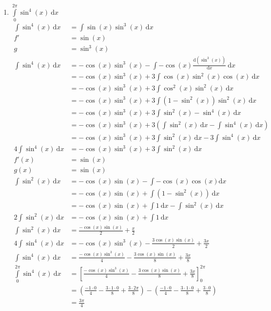 \documentclass[10pt]{article}
\begin{document}
\begin{enumerate}[start=5,leftmargin=1in]
\begin{enumerate}
        \item $\int\limits_{0}^{2\pi} \sin^4(x) \: \text{d}x$
        \begin{align*}
            \int \sin^4(x) \: \text{d}x &= \int \sin(x) \sin^3(x) \: \text{d}x \\
            f' &= \sin(x) \\
            g &= \sin^3(x) \\
            \int \sin^4(x) \: \text{d}x &= - \cos(x) \sin^3(x) - \int -\cos(x) \frac{\text{d}(\sin^3(x))}{\text{d}x} \: \text{d}x \\
            &= - \cos(x) \sin^3(x) + 3 \int \cos(x) \sin^2(x) \cos(x) \: \text{d}x \\
            &= - \cos(x) \sin^3(x) + 3 \int \cos^2(x) \sin^2(x) \: \text{d}x \\
            &= - \cos(x) \sin^3(x) + 3 \int (1 - \sin^2(x)) \sin^2(x) \: \text{d}x \\
            &= - \cos(x) \sin^3(x) + 3 \int \sin^2(x) - \sin^4(x) \: \text{d}x \\
            &= - \cos(x) \sin^3(x) + 3 \left(\int \sin^2(x) \: \text{d}x - \int \sin^4(x) \: \text{d}x\right) \\
            &= - \cos(x) \sin^3(x) + 3\int \sin^2(x) \: \text{d}x - 3\int \sin^4(x) \: \text{d}x \\
            4\int \sin^4(x) \: \text{d}x &= - \cos(x) \sin^3(x) + 3\int \sin^2(x) \: \text{d}x \\
            f'(x) &= \sin(x) \\
            g(x) &= \sin(x) \\
            \int \sin^2(x) \: \text{d}x &= - \cos(x) \sin(x) - \int - \cos(x) \cos(x) \text{d}x \\
            &= - \cos(x) \sin(x) + \int (1 - \sin^2(x)) \: \text{d}x \\
            &= - \cos(x) \sin(x) + \int 1 \: \text{d}x - \int \sin^2(x) \: \text{d}x \\
            2\int \sin^2(x) \: \text{d}x &= - \cos(x) \sin(x) + \int 1 \: \text{d}x \\
            \int \sin^2(x) \: \text{d}x &= \frac{- \cos(x) \sin(x)}{2} + \frac{x}{2} \\
            4\int \sin^4(x) \: \text{d}x &= - \cos(x) \sin^3(x) - \frac{3\cos(x) \sin(x)}{2} + \frac{3x}{2} \\
            \int \sin^4(x) \: \text{d}x &= \frac{- \cos(x) \sin^3(x)}{4} - \frac{3\cos(x) \sin(x)}{8} + \frac{3x}{8} \\
            \int\limits_{0}^{2\pi} \sin^4(x) \: \text{d}x &= \left[\frac{- \cos(x) \sin^3(x)}{4} - \frac{3\cos(x) \sin(x)}{8} + \frac{3x}{8}\right]_{0}^{2\pi} \\
            &= \left(\frac{- 1 \cdot 0}{4} - \frac{3 \cdot 1 \cdot 0}{8} + \frac{3 \cdot 2\pi}{8}\right) - \left(\frac{- 1 \cdot 0}{4} - \frac{3 \cdot 1 \cdot 0}{8} + \frac{3 \cdot 0}{8}\right) \\
            &= \frac{3\pi}{4}
        \end{align*}


\end{enumerate}
\end{enumerate}
\end{document}
